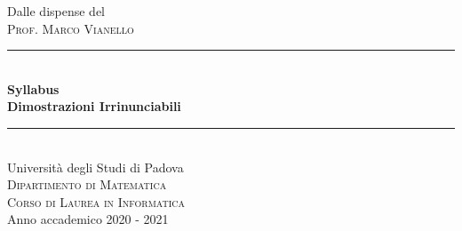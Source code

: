 \documentclass[12pt,a4paper,headings=optiontohead]{article}
\begin{document}

\begin{titlepage}

\newcommand{\HRule}{\rule{\linewidth}{0.5mm}} %

\center %
 


\large Dalle dispense del\\[0.5cm] %
\textsc{\Large Prof. Marco Vianello}\\[1.5cm] %

\HRule \\[0.4cm]
{ \huge \bfseries Syllabus}\\
{ \huge \bfseries Dimostrazioni Irrinunciabili\\[0.15 cm]} %
\HRule \\[1.5cm]
 



\LARGE Università degli Studi di Padova\\[0.4cm] %
\textsc{\large Dipartimento di Matematica}\\[0.05cm]
\textsc{\large Corso di Laurea in Informatica}\\[1cm] %

{\Large Anno accademico 2020 - 2021}\\[2cm] %

\vfill %

\end{titlepage}
\end{document}
